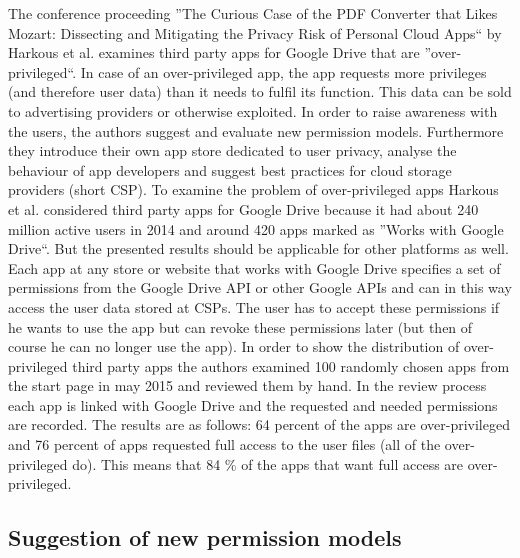 \documentclass[11pt,twocolumn,a4paper,DIV=calc]{scrartcl}
\begin{document}
The conference proceeding ''The Curious Case of the PDF Converter that Likes Mozart: Dissecting and Mitigating the Privacy Risk of Personal Cloud Apps`` by Harkous et al. examines third party apps for Google Drive that are ''over-privileged``. 
In case of an over-privileged app, the app requests more privileges (and therefore user data) than it needs to fulfil its function. 
This data can be sold to advertising providers or otherwise exploited. 
In order to raise awareness with the users, the authors suggest and evaluate new permission models. 
Furthermore they introduce their own app store dedicated to user privacy, analyse the behaviour of app developers and suggest best practices for cloud storage providers (short CSP).
To examine the problem of over-privileged apps Harkous et al. considered third party apps for Google Drive because it had about 240 million active users in 2014 and around 420 apps marked as ''Works with Google Drive``. 
But the presented results should be applicable for other platforms as well. 
Each app at any store or website that works with Google Drive specifies a set of permissions from the Google Drive API or other Google APIs and can in this way access the user data stored at CSPs. 
The user has to accept these permissions if he wants to use the app but can revoke these permissions later (but then of course he can no longer use the app). 
In order to show the distribution of over-privileged third party apps the authors examined 100 randomly chosen apps from the start page in may 2015 and reviewed them by hand. 
In the review process each app is linked with Google Drive and the requested and needed permissions are recorded. 
The results are as follows: 64 percent of the apps are over-privileged and 76 percent of apps requested full access to the user files (all of the over-privileged do). 
This means that 84 \% of the apps that want full access are over-privileged. \\

\subsection{Suggestion of new permission models}
\end{document}
